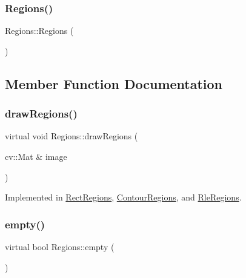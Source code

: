 \subsubsection{\texorpdfstring{Regions()}{Regions()}}
{\footnotesize\ttfamily Regions\+::\+Regions (\begin{DoxyParamCaption}{ }\end{DoxyParamCaption})\hspace{0.3cm}{\ttfamily [inline]}}



\subsection{Member Function Documentation}
\mbox{\label{struct_regions_adab32a2a00fc77abb6f4876939dc8505}} 
\subsubsection{\texorpdfstring{draw\+Regions()}{drawRegions()}}
{\footnotesize\ttfamily virtual void Regions\+::draw\+Regions (\begin{DoxyParamCaption}\item[{cv\+::\+Mat \&}]{image }\end{DoxyParamCaption})\hspace{0.3cm}{\ttfamily [pure virtual]}}



Implemented in \hyperlink{struct_rect_regions_a9f31dc6fd3d371417e2c9024d1fdeecb}{Rect\+Regions}, \hyperlink{struct_contour_regions_a4f77a669499f53d59e51aa30ec040bc6}{Contour\+Regions}, and \hyperlink{struct_rle_regions_aedcc9f614d38a2882a589e3014799d91}{Rle\+Regions}.

\mbox{\label{struct_regions_a5763d0526981f665356ac35734e8e505}} 
\subsubsection{\texorpdfstring{empty()}{empty()}}
{\footnotesize\ttfamily virtual bool Regions\+::empty (\begin{DoxyParamCaption}{ }\end{DoxyParamCaption})\hspace{0.3cm}{\ttfamily [pure virtual]}}



